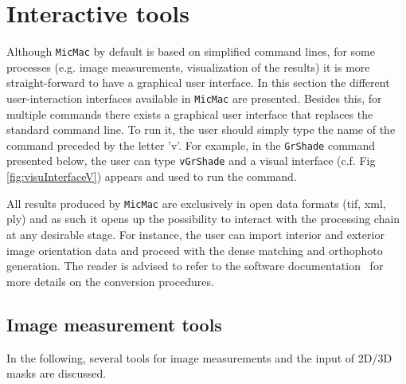 
\section*{Interactive tools}
Although {\tt MicMac} by default is based on simplified command lines, for some processes (e.g. image measurements, visualization of the results)  it is more straight-forward to have a graphical user interface. In this section the different user-interaction interfaces available in {\tt MicMac} are presented. Besides this, for multiple commands there exists a graphical user interface that replaces the standard command line. To run it, the user should simply type the name of the command preceded by the letter 'v'. For example, in the {\tt GrShade} command presented below, the user can type {\tt vGrShade} and a visual interface (c.f. Fig  \ref{fig:visuInterfaceV}) appears and used to run the command.\par 
%
All results produced by {\tt MicMac} are exclusively in open data formats (tif, xml, ply) and as such it opens up the possibility to interact with the processing chain at any desirable stage. For instance, the user can import interior and exterior image orientation data and proceed with the dense matching and orthophoto generation. The reader is advised to refer to the software documentation~\cite{micmac:manual} for more details on the conversion procedures. 
 
\subsection*{Image measurement tools}
In the following, several tools for image measurements and the input of 2D/3D masks are discussed.

